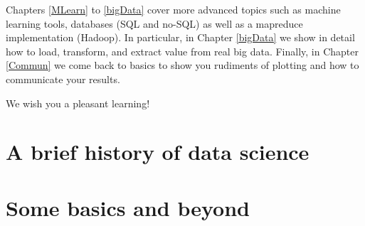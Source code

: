 \documentclass[10pt]{PhDthesisPSnPDF}%
\begin{document}
Chapters \ref{MLearn} to \ref{bigData} cover more advanced topics such as machine learning tools, databases (SQL and no-SQL) as well as a mapreduce implementation (Hadoop). In particular, in Chapter \ref{bigData} we show in detail how to load, transform, and extract value from real big data. Finally, in Chapter \ref{Commun} we come back to basics to show you rudiments of plotting and how to communicate your results. 

We wish you a pleasant learning!

\newpage
\thispagestyle{empty}
\mbox{}
\cleardoublepage

\setcounter{tocdepth}{2}




\setcounter{secnumdepth}{3} %
\setcounter{tocdepth}{2}    %
\tableofcontents            %


	


\newpage
\chapter{A brief history of data science}\label{DS}

\cleardoublepage



\newpage
\chapter{Some basics and beyond}
\label{basics}

 \cleardoublepage
\end{document}
